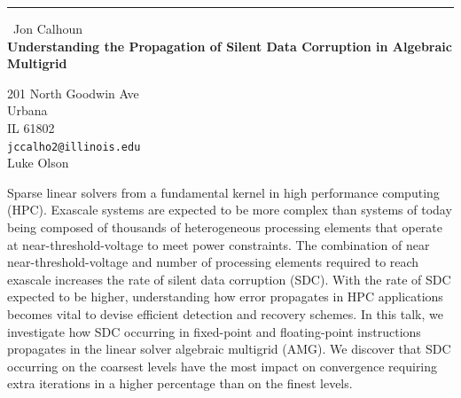 \documentclass{report}
\begin{document}
\begin{center}
\rule{6in}{1pt} \
{\large Jon Calhoun \\
{\bf Understanding the Propagation of Silent Data Corruption in Algebraic Multigrid}}

201 North Goodwin Ave \\ Urbana \\ IL 61802
\\
{\tt jccalho2@illinois.edu}\\
Luke Olson\end{center}

Sparse linear solvers from a fundamental kernel in high performance computing (HPC).
Exascale systems are expected to be more complex than systems of today
being composed of thousands of
heterogeneous processing elements that operate at near-threshold-voltage to meet
power constraints. The combination of near near-threshold-voltage and number of
processing elements required to reach exascale increases the rate of
silent data corruption (SDC).
With the rate of SDC expected
to be higher, understanding how error propagates in HPC applications becomes vital
to devise efficient detection and recovery schemes. In this talk, we investigate
how SDC occurring in fixed-point and floating-point instructions
propagates in the linear solver algebraic multigrid (AMG). We discover
that
SDC occurring on the coarsest levels have the most impact on convergence
requiring extra iterations in a higher percentage than on the finest
levels.
\end{document}
